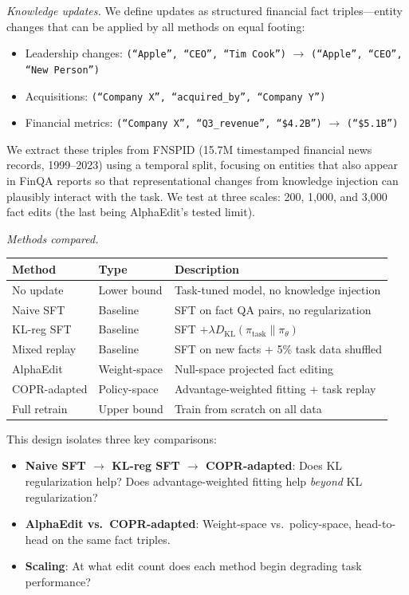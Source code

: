 \documentclass{article}
\begin{document}
\textit{Knowledge updates.}
We define updates as structured financial fact triples---entity changes that can be applied by all methods on equal footing:
\begin{itemize}
    \item Leadership changes: \texttt{(``Apple'', ``CEO'', ``Tim Cook'')} $\to$ \texttt{(``Apple'', ``CEO'', ``New Person'')}
    \item Acquisitions: \texttt{(``Company X'', ``acquired\_by'', ``Company Y'')}
    \item Financial metrics: \texttt{(``Company X'', ``Q3\_revenue'', ``\$4.2B'')} $\to$ \texttt{(``\$5.1B'')}
\end{itemize}
We extract these triples from FNSPID \citep{dong2024fnspid} (15.7M timestamped financial news records, 1999--2023) using a temporal split, focusing on entities that also appear in FinQA reports so that representational changes from knowledge injection can plausibly interact with the task. We test at three scales: 200, 1{,}000, and 3{,}000 fact edits (the last being AlphaEdit's tested limit).

\textit{Methods compared.}

\begin{table}[h]
\centering
\small
\begin{tabular}{@{}lll@{}}
\toprule
\textbf{Method} & \textbf{Type} & \textbf{Description} \\
\midrule
No update & Lower bound & Task-tuned model, no knowledge injection \\
Naive SFT & Baseline & SFT on fact QA pairs, no regularization \\
KL-reg SFT & Baseline & SFT $+ \lambda D_{\mathrm{KL}}(\pi_{\text{task}} \| \pi_\theta)$ \\
Mixed replay & Baseline & SFT on new facts + 5\% task data shuffled \\
AlphaEdit & Weight-space & Null-space projected fact editing \\
COPR-adapted & Policy-space & Advantage-weighted fitting + task replay \\
Full retrain & Upper bound & Train from scratch on all data \\
\bottomrule
\end{tabular}
\end{table}

This design isolates three key comparisons:
\begin{itemize}
    \item \textbf{Naive SFT $\to$ KL-reg SFT $\to$ COPR-adapted}: Does KL regularization help? Does advantage-weighted fitting help \emph{beyond} KL regularization?
    \item \textbf{AlphaEdit vs.\ COPR-adapted}: Weight-space vs.\ policy-space, head-to-head on the same fact triples.
    \item \textbf{Scaling}: At what edit count does each method begin degrading task performance?
\end{itemize}
\end{document}
